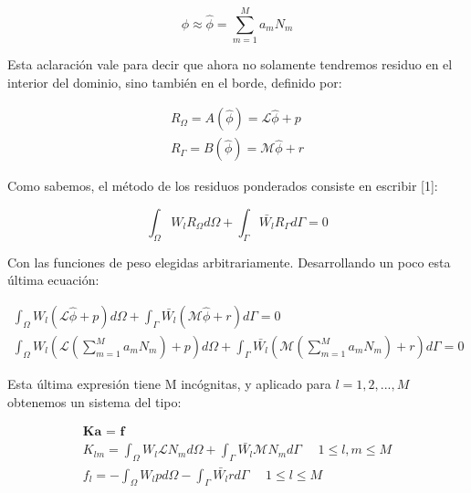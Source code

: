 \documentclass[11pt]{article}
\begin{document}
\begin{equation}
\phi \approx \hat{\phi} = \sum_{m=1}^M a_m N_m
\end{equation}

\bigskip Esta aclaraci\'on vale para decir que ahora no solamente tendremos residuo en el interior del dominio, sino tambi\'en en el borde, definido por:

\begin{equation}
\begin{split}
R_\Omega = A(\hat{\phi}) = \mathcal{L}\hat{\phi} + p \\
R_\Gamma = B(\hat{\phi}) = \mathcal{M}\hat{\phi} + r
\end{split}
\end{equation}

\bigskip Como sabemos, el m\'etodo de los residuos ponderados consiste en escribir [1]:

\begin{equation}
\int_\Omega W_l R_\Omega d\Omega + \int_\Gamma \bar{W_l} R_\Gamma d\Gamma = 0
\end{equation}

\bigskip Con las funciones de peso elegidas arbitrariamente. Desarrollando un poco esta \'ultima ecuaci\'on:

\begin{equation}
\begin{split}
\int_\Omega W_l (\mathcal{L}\hat{\phi} + p) d\Omega + \int_\Gamma \bar{W_l} (\mathcal{M}\hat{\phi} + r) d\Gamma = 0 \\
\int_\Omega W_l (\mathcal{L}(\sum_{m=1}^M a_m N_m) + p) d\Omega + \int_\Gamma \bar{W_l} (\mathcal{M}(\sum_{m=1}^M a_m N_m) + r) d\Gamma = 0
\end{split}
\end{equation}

\bigskip Esta \'ultima expresi\'on tiene M inc\'ognitas, y aplicado para $ l = 1,2,...,M$ obtenemos un sistema del tipo:

\begin{equation}
\begin{split}
\textbf{Ka = f} \\
K_{lm} = \int_\Omega W_l \mathcal{L} N_m d\Omega + \int_\Gamma \bar{W_l} \mathcal{M} N_m d\Gamma \ \ \ \ \ \ 1 \leq l,m \leq M \\
f_l = - \int_\Omega W_l p d\Omega - \int_\Gamma \bar{W_l} r d\Gamma \ \ \ \ \ \ 1 \leq l \leq M \\
\end{split}
\end{equation}
\end{document}
